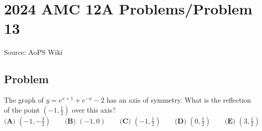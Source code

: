 \documentclass[12pt]{article}
\begin{document}
\section*{{2024 AMC 12A Problems/Problem 13}}
Source: AoPS Wiki

\subsection*{Problem}
The graph of $y=e^{x+1}+e^{-x}-2$ has an axis of symmetry. What is the reflection of the point $(-1,\tfrac{1}{2})$ over this axis? $\textbf{(A) }\left(-1,-\frac{3}{2}\right)\qquad\textbf{(B) }(-1,0)\qquad\textbf{(C) }\left(-1,\frac{1}{2}\right)\qquad\textbf{(D) }\left(0,\frac{1}{2}\right)\qquad\textbf{(E) }\left(3,\frac{1}{2}\right)$
\end{document}
